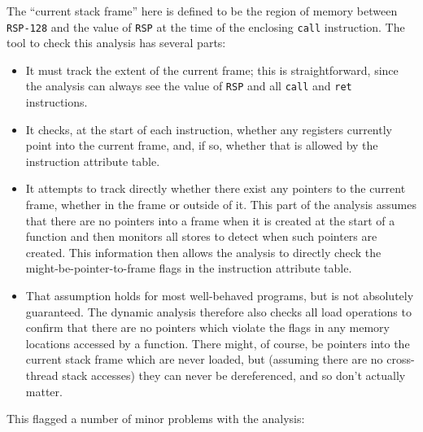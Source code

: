 The ``current stack frame'' here is defined to be the region of memory between \verb|RSP-128| and the value of \verb|RSP| at the time of the enclosing \verb|call| instruction.
The tool to check this analysis has several parts:

\begin{itemize}
\item
  It must track the extent of the current frame; this is straightforward, since the analysis can always see the value of \verb|RSP| and all \verb|call| and \verb|ret| instructions.
\item
  It checks, at the start of each instruction, whether any registers currently point into the current frame, and, if so, whether that is allowed by the instruction attribute table.
\item
  It attempts to track directly whether there exist any pointers to the current frame, whether in the frame or outside of it.
  This part of the analysis assumes that there are no pointers into a frame when it is created at the start of a function and then monitors all stores to detect when such pointers are created.
  This information then allows the analysis to directly check the might-be-pointer-to-frame flags in the instruction attribute table.
\item
  That assumption holds for most well-behaved programs, but is not absolutely guaranteed.
  The dynamic analysis therefore also checks all load operations to confirm that there are no pointers which violate the flags in any memory locations accessed by a function.
  There might, of course, be pointers into the current stack frame which are never loaded, but (assuming there are no cross-thread stack accesses) they can never be dereferenced, and so don't actually matter.
\end{itemize}

This flagged a number of minor problems with the analysis:

